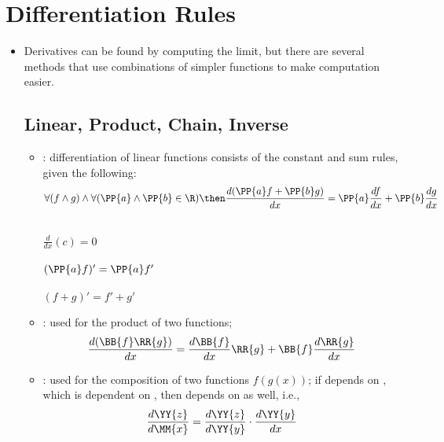 \section{Differentiation Rules}
\begin{itemize}
   \item Derivatives can be found by computing the limit, but there are several
     methods that use combinations of simpler functions to make computation
     easier.

  \subsection{Linear, Product, Chain, Inverse}
  \begin{itemize}
    \item {}: differentiation of linear functions consists of the
      constant and sum rules, given the following:
    \[
      \forall(f \land g) \land \forall(\PP{a} \land \PP{b} \in \R) \then
      \frac{d(\PP{a}f + \PP{b}g)}{dx} = \PP{a}\frac{df}{dx} +
      \PP{b}\frac{dg}{dx}
    \]
    \vspace{-18pt}
    \begin{multicols}{3}
       \\ \( \frac{d}{dx} (c) = 0\) \\
       \\ \( (\PP{a}f)' = \PP{a}f' \) \\
       \\ \( (f + g)' = f' + g' \) \\
    \end{multicols}

    \item {}: used for the product of two functions; 
      \[
        \frac{d(\BB{f}\RR{g})}{dx} = \frac{d\BB{f}}{dx} \RR{g} +
        \BB{f}\frac{d\RR{g}}{dx}
      \]
    \item {}: used for the composition of two functions \( f(g(x))
      \); if  depends on , which is dependent on
      , then depends on as well, i.e.,
      \[
        \frac{d \YY{z}}{d \MM{x}} = \frac{d \YY{z}}{d \YY{y}} \cdot \frac{d
        \YY{y}}{dx}
      \]
      \begin{itemize}


\end{itemize}
\end{itemize}
\end{itemize}

